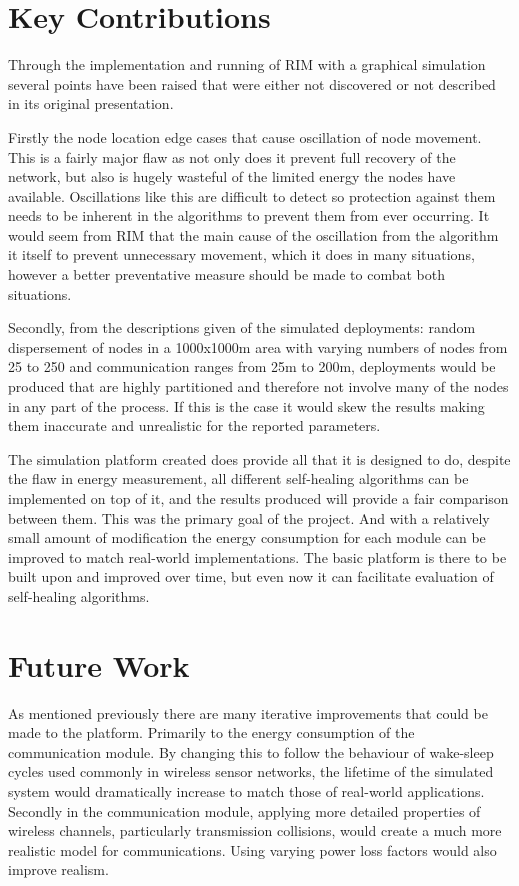 \documentclass[authoryearcitations]{UoYCSproject}
\begin{document}
\section{Key Contributions}
\label{sec:keyContrib}

Through the implementation and running of RIM with a graphical simulation several points have been raised that were either not discovered or not described in its original presentation.

Firstly the node location edge cases that cause oscillation of node movement. This is a fairly major flaw as not only does it prevent full recovery of the network, but also is hugely wasteful of the limited energy the nodes have available. Oscillations like this are difficult to detect so protection against them needs to be inherent in the algorithms to prevent them from ever occurring. It would seem from RIM that the main cause of the oscillation from the algorithm it itself to prevent unnecessary movement, which it does in many situations, however a better preventative measure should be made to combat both situations.

Secondly, from the descriptions given of the simulated deployments: random dispersement of nodes in a 1000x1000m area with varying numbers of nodes from 25 to 250 and communication ranges from 25m to 200m, deployments would be produced that are highly partitioned and therefore not involve many of the nodes in any part of the process. If this is the case it would skew the results making them inaccurate and unrealistic for the reported parameters.

The simulation platform created does provide all that it is designed to do, despite the flaw in energy measurement, all different self-healing algorithms can be implemented on top of it, and the results produced will provide a fair comparison between them. This was the primary goal of the project. And with a relatively small amount of modification the energy consumption for each module can be improved to match real-world implementations. The basic platform is there to be built upon and improved over time, but even now it can facilitate evaluation of self-healing algorithms.

\section{Future Work}
As mentioned previously there are many iterative improvements that could be made to the platform. Primarily to the energy consumption of the communication module. By changing this to follow the behaviour of wake-sleep cycles used commonly in wireless sensor networks, the lifetime of the simulated system would dramatically increase to match those of real-world applications. Secondly in the communication module, applying more detailed properties of wireless channels, particularly transmission collisions, would create a much more realistic model for communications. Using varying power loss factors would also improve realism.
\end{document}
